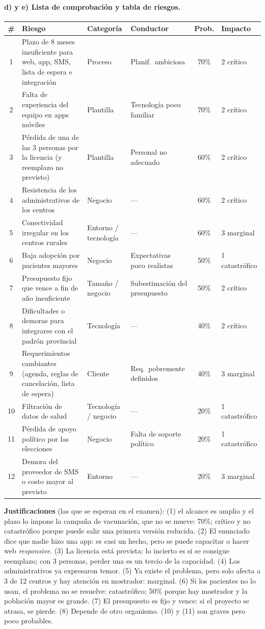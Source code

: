 \documentclass[11pt,a4paper]{article}
\begin{document}
\paragraph{d) y e) Lista de comprobación y tabla de riesgos.}
\begin{center}\small
\begin{tabularx}{\textwidth}{@{}c X l l c l@{}}
\toprule
\# & Riesgo & Categoría & Conductor & Prob. & Impacto\\
\midrule
1 & Plazo de 8 meses insuficiente para web, app, SMS, lista de espera e integración & Proceso & Planif.\ ambiciosa & 70\% & 2 crítico\\
2 & Falta de experiencia del equipo en apps móviles & Plantilla & Tecnología poco familiar & 70\% & 2 crítico\\
3 & Pérdida de una de las 3 personas por la licencia (y reemplazo no previsto) & Plantilla & Personal no adecuado & 60\% & 2 crítico\\
4 & Resistencia de los administrativos de los centros & Negocio & --- & 60\% & 2 crítico\\
5 & Conectividad irregular en los centros rurales & Entorno / tecnología & --- & 60\% & 3 marginal\\
6 & Baja adopción por pacientes mayores & Negocio & Expectativas poco realistas & 50\% & 1 catastrófico\\
7 & Presupuesto fijo que vence a fin de año insuficiente & Tamaño / negocio & Subestimación del presupuesto & 50\% & 2 crítico\\
8 & Dificultades o demoras para integrarse con el padrón provincial & Tecnología & --- & 40\% & 2 crítico\\
9 & Requerimientos cambiantes (agenda, reglas de cancelación, lista de espera) & Cliente & Req.\ pobremente definidos & 40\% & 3 marginal\\
10 & Filtración de datos de salud & Tecnología / negocio & --- & 20\% & 1 catastrófico\\
11 & Pérdida de apoyo político por las elecciones & Negocio & Falta de soporte político & 20\% & 1 catastrófico\\
12 & Demora del proveedor de SMS o costo mayor al previsto & Entorno & --- & 20\% & 3 marginal\\
\bottomrule
\end{tabularx}
\end{center}
\textbf{Justificaciones} (las que se esperan en el examen): (1) el alcance es amplio y el plazo lo impone la
campaña de vacunación, que no se mueve: 70\%; crítico y no catastrófico porque puede salir una primera versión
reducida. (2) El enunciado dice que nadie hizo una app: es casi un hecho, pero se puede capacitar o hacer web
\emph{responsive}. (3) La licencia está prevista: lo incierto es si se consigue reemplazo; con 3 personas, perder
una es un tercio de la capacidad. (4) Los administrativos ya expresaron temor. (5) Ya existe el problema, pero solo
afecta a 3 de 12 centros y hay atención en mostrador: marginal. (6) Si los pacientes no lo usan, el problema no se
resuelve: catastrófico; 50\% porque hay mostrador y la población mayor es grande. (7) El presupuesto es fijo y
vence: si el proyecto se atrasa, se pierde. (8) Depende de otro organismo. (10) y (11) son graves pero poco
probables.
\end{document}
